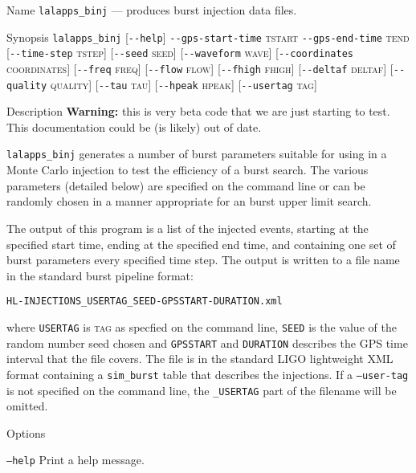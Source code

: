 \begin{entry}
\item[Name]
\verb$lalapps_binj$ --- produces burst injection data files.

\item[Synopsis]
\verb$lalapps_binj$ 
[\verb$--help$]
\verb$--gps-start-time$ \textsc{tstart} 
\verb$--gps-end-time$ \textsc{tend} 
[\verb$--time-step$ \textsc{tstep}]
[\verb$--seed$ \textsc{seed}]
[\verb$--waveform$ \textsc{wave}]
[\verb$--coordinates$ \textsc{coordinates}]
[\verb$--freq$ \textsc{freq}]
[\verb$--flow$ \textsc{flow}]
[\verb$--fhigh$ \textsc{fhigh}]
[\verb$--deltaf$ \textsc{deltaf}]
[\verb$--quality$ \textsc{quality}]
[\verb$--tau$ \textsc{tau}]
[\verb$--hpeak$ \textsc{hpeak}]
[\verb$--usertag$ \textsc{tag}]

\item[Description] 
\textbf{Warning:}  this is very beta code that we are just starting to
test.   This documentation could be (is likely) out of date.

\verb$lalapps_binj$
generates a number of burst  parameters suitable  for using in a Monte
Carlo injection to test the efficiency of a burst search.  The  various
parameters (detailed  below)  are specified on the command line or can be
randomly chosen in a manner appropriate for an burst upper limit
search.

The output of this program  is  a  list  of  the  injected events,  starting
at  the specified start time, ending at the specified end time, and containing
one set  of burst parameters every specified time step.  The output
is written to a file name in the standard burst pipeline format:
\begin{center}
\begin{verbatim}
HL-INJECTIONS_USERTAG_SEED-GPSSTART-DURATION.xml
\end{verbatim}
\end{center}
where \verb$USERTAG$ is \textsc{tag} as specfied on the command line, 
\verb$SEED$ is the  value  of  the random number seed chosen and 
\verb$GPSSTART$ and \verb$DURATION$ describes the GPS time interval that
the file covers. The file is in the standard LIGO lightweight XML format
containing a \texttt{sim\_burst} table that describes the injections.
If a \texttt{--user-tag} is not specified on the command line, the
\texttt{\_USERTAG} part of the filename will be omitted.

\item[Options]\leavevmode
\begin{entry}
\item[\texttt{--help}] Print a help message.


\end{entry}
\end{entry}
